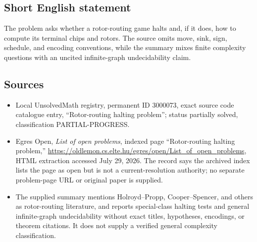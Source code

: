 \documentclass[11pt]{article}
\begin{document}
\subsection{Short English statement}
The problem asks whether a rotor-routing game halts and, if it does, how to compute its terminal chips and rotors. The source omits move, sink, sign, schedule, and encoding conventions, while the summary mixes finite complexity questions with an uncited infinite-graph undecidability claim.
\subsection{Sources}
\begin{itemize}
\item Local UnsolvedMath registry, permanent ID 3000073, exact source code catalogue entry, ``Rotor-routing halting problem''; status partially solved, classification PARTIAL-PROGRESS.
\item Egres Open, \emph{List of open problems}, indexed page ``Rotor-routing halting problem,'' \url{https://oldlemon.cs.elte.hu/egres/open/List_of_open_problems}, HTML extraction accessed July 29, 2026. The record says the archived index lists the page as open but is not a current-resolution authority; no separate problem-page URL or original paper is supplied.
\item The supplied summary mentions Holroyd--Propp, Cooper--Spencer, and others as rotor-routing literature, and reports special-class halting tests and general infinite-graph undecidability without exact titles, hypotheses, encodings, or theorem citations. It does not supply a verified general complexity classification.
\end{itemize}
\end{document}
